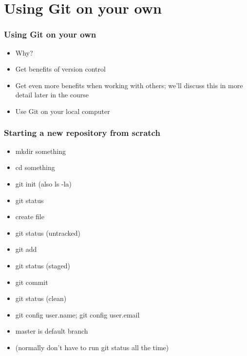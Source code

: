 \documentclass{git_course}
\begin{document}
\section{Using Git on your own}

\begin{frame}
\frametitle{Using Git on your own}
\begin{itemize}
    \item Why?
    \item Get benefits of version control
    \item Get even more benefits when working with others; we'll discuss
        this in more detail later in the course
    \item Use Git on your local computer
\end{itemize}
\end{frame}

\begin{frame}
\frametitle{Starting a new repository from scratch}
\begin{itemize}
    \item mkdir something
    \item cd something
    \item git init  (also ls -la)
    \item git status
    \item create file
    \item git status (untracked)
    \item git add
    \item git status (staged)
    \item git commit
    \item git status (clean)
    \item git config user.name; git config user.email
    \item master is default branch
    \item (normally don't have to run git status all the time)
\end{itemize}
\end{frame}
\end{document}
